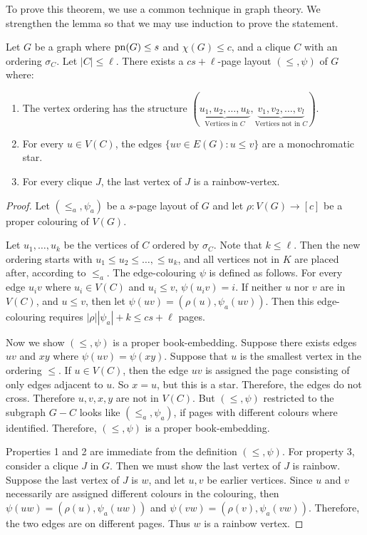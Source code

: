 To prove this theorem, we use a common technique in graph theory. We strengthen the lemma so that we may use induction to prove the statement.
\begin{lemma}\label{lem:Hickingbotham_Lemma}
	Let \(G\) be a graph where \(\operatorname{pn}(G) \leq s\) and \(\chi(G) \leq c\), and a clique \(C\) with an ordering \(\sigma_C\). Let \(|C| \leq \ell\). There exists a \(cs + \ell\)-page layout \((\leq, \psi)\) of \(G\) where:
	\begin{enumerate}
		\item The vertex ordering has the structure \((\underbrace{u_1, u_2, \ldots, u_k}_{\text{Vertices in } C}, \underbrace{v_1, v_2, \ldots, v_l}_{\text{Vertices not in }C})\).
		\item For every \(u \in V(C)\), the edges \(\lbrace uv \in E(G) : u \leq v \rbrace\) are a monochromatic star.
		\item For every clique \(J\), the last vertex of \(J\) is a rainbow-vertex.
	\end{enumerate}
\end{lemma}
\begin{proof}
	Let \((\leq_a, \psi_a)\) be a \(s\)-page layout of \(G\) and let \(\rho: V(G) \rightarrow [c]\) be a proper colouring of \(V(G)\).

	Let \(u_1, \ldots, u_k\) be the vertices of \(C\) ordered by \(\sigma_C\). Note that \(k \leq \ell\). Then the new ordering starts with \(u_1 \leq u_2 \leq \ldots, \leq u_k\), and all vertices not in \(K\) are placed after, according to \(\leq_a\).
	The edge-colouring \(\psi\) is defined as follows. For every edge \(u_i v\) where \(u_i \in V(C)\) and \(u_i \leq v\), \(\psi(u_i v) = i\). If neither \(u\) nor \(v\) are in \(V(C)\), and \(u \leq v\), then let \(\psi(uv) = (\rho(u), \psi_a(uv))\). Then this edge-colouring requires \(|\rho| |\psi_a| + k \leq cs + \ell\) pages.

	Now we show \((\leq, \psi)\) is a proper book-embedding. Suppose there exists edges \(uv\) and \(xy\) where \(\psi(uv) = \psi(xy)\). Suppose that \(u\) is the smallest vertex in the ordering \(\leq\). If \(u \in V(C)\), then the edge \(uv\) is assigned the page consisting of only edges adjacent to $u$. So \(x = u\), but this is a star. Therefore, the edges do not cross. Therefore \(u, v, x, y\) are not in \(V(C)\). But \((\leq, \psi)\) restricted to the subgraph $G - C$ looks like \((\leq_a, \psi_a)\), if pages with different colours where identified. Therefore, \((\leq, \psi)\) is a proper book-embedding.  
	\par
	Properties 1 and 2 are immediate from the definition \((\leq, \psi)\). For property 3, consider a clique \(J\) in \(G\). Then we must show the last vertex of \(J\) is rainbow. Suppose the last vertex of \(J\) is \(w\), and let \(u, v\) be earlier vertices. Since \(u\) and \(v\) necessarily are assigned different colours in the colouring, then \(\psi(uw) = (\rho(u), \psi_a(uw))\) and \(\psi(vw) = (\rho(v), \psi_a(vw))\). Therefore, the two edges are on different pages. Thus \(w\) is a rainbow vertex.
\end{proof}

